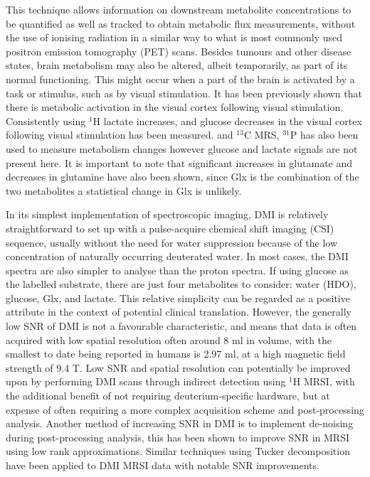 \documentclass[class=article, crop=false]{standalone}
\begin{document}
This technique allows information on downstream metabolite concentrations to be quantified as well as tracked to obtain metabolic flux measurements, without the use of ionising radiation in a similar way to what is most commonly used positron emission tomography (PET) scans. Besides tumours and other disease states, brain metabolism may also be altered, albeit temporarily, as part of its normal functioning. This might occur when a part of the brain is activated by a task or stimulus, such as by visual stimulation. It has been previously shown that there is metabolic activation in the visual cortex following visual stimulation\cite{Kushner1988CerebralStimulation, Beland-Millar2018FluctuationsStimulation}. Consistently using $^1$H lactate increases\cite{Prichard1991LactateStimulation., Sappey-Marinier1992EffectSpectroscopy, Fernandes2020MeasurementT}, and glucose decreases\cite{Lin2012InvestigatingT} in the visual cortex following visual stimulation has been measured. and $^{13}$C\cite{Chhina2001MeasurementSpectroscopy} MRS, $^{31}$P has also been used to measure metabolism changes\cite{Sappey-Marinier1992EffectSpectroscopy} however glucose and lactate signals are not present here. It is important to note that significant increases in glutamate and decreases in glutamine have also been shown\cite{Lin2012InvestigatingT}, since Glx is the combination of the two metabolites a statistical change in Glx is unlikely. 
 
In its simplest implementation of spectroscopic imaging, DMI is relatively straightforward to set up with a pulse-acquire chemical shift imaging (CSI) sequence, usually without the need for water suppression because of the low concentration of naturally occurring deuterated water. In most cases, the DMI spectra are also simpler to analyse than the proton spectra. If using glucose as the labelled substrate, there are just four metabolites to consider: water (HDO), glucose, Glx, and lactate. This relative simplicity can be regarded as a positive attribute in the context of potential clinical translation. However, the generally low SNR of DMI is not a favourable characteristic, and means that data is often acquired with low spatial resolution often around 8 ml\cite{DeFeyter2021DeuteriumFuture, deGraaf2020OnImaging} in volume, with the smallest to date being reported in humans is 2.97 ml\cite{Ruhm2022Dynamic9.4T}, at a high magnetic field strength of 9.4 T. Low SNR and spatial resolution can potentially be improved upon by performing DMI scans through indirect detection using $^1$H MRSI\cite{vanZijl2020SpectroscopicFluxes, Bednarik2021DeuteriumBrain, Niess2023Reproducibility3T, Ruhm2022Dynamic9.4T}, with the additional benefit of not requiring deuterium-specific hardware, but at expense of often requiring a more complex acquisition scheme and post-processing analysis. Another method of increasing SNR in DMI is to implement de-noising during post-processing analysis, this has been shown to improve SNR in MRSI using low rank approximations\cite{Nguyen2013DenoisingApproximations}. Similar techniques using Tucker decomposition\cite{Tucker1966SomeAnalysis, Bader2007EfficientTensors} have been applied to DMI MRSI data with notable SNR improvements\cite{vonMorze2021ComparisonT, Kreis2020MeasuringMRI}.
\end{document}

